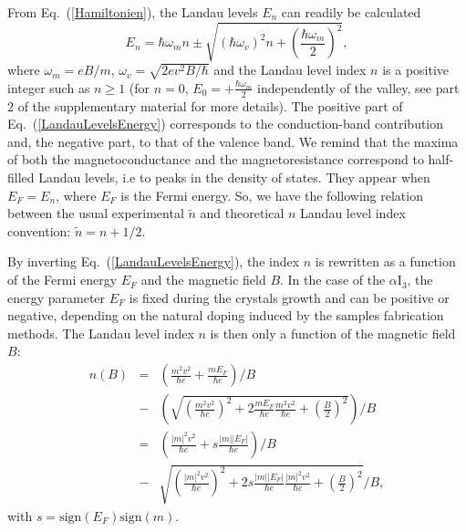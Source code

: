 \documentclass[doublecol]{epl2}
\begin{document}
From Eq.~(\ref{Hamiltonien}), the Landau levels $E_{n}$ can readily be calculated~\cite{MarkPhaseBerryContinuous,Sharapov,Rashba,Wang}
\begin{equation}
E_{n}=\hbar\omega_{m} n\pm \sqrt{\left(\hbar\omega_{v}\right)^2\! n +\left(\frac{\hbar \omega_{m}}{2}\right)^2},
\label{LandauLevelsEnergy}
\end{equation}
where $\omega_{m}=eB/m$, $\omega_{v}= \sqrt{2e v^2 B/\hbar}$ and the Landau level index $n$ is a positive integer such as $n\geq 1$ 
(for $n=0$, $E_{0}=+\frac{\hbar\omega_{m}}{2}$ independently of the valley, see part $2$ of the supplementary material for more details). The positive part of Eq.~(\ref{LandauLevelsEnergy}) corresponds to the conduction-band
contribution and, the negative part, to that of the valence band. We remind that the maxima of both the magnetoconductance and the magnetoresistance correspond to half-filled Landau levels, i.e to peaks in the density of states\cite{Coleridge,Ando}. They appear when $E_{F}=E_{n}$, where $E_{F}$ is the Fermi energy. 
So, we have the following relation between the usual experimental $\tilde{n}$ and theoretical $n$ Landau level index convention: $\tilde{n}=n+1/2$.  

By inverting Eq.~(\ref{LandauLevelsEnergy}), the index $n$ is rewritten as a function of the Fermi energy $E_{F}$ and the magnetic field $B$. In the case of the $\alpha$I$_{3}$, the energy parameter $E_{F}$ is fixed during the crystals growth and can be positive or negative, depending on the natural doping induced by the samples fabrication methods. The Landau level index $n$ is then only a function of the magnetic field $B$: 
\begin{equation}
\begin{array}{lll}
n(B)&=&\left(\frac{m^2v^2}{\hbar e}+\frac{mE_{F}}{\hbar e}\right)/B\\[0.15cm]
&-&\left(\sqrt{\left(\frac{m^2v^2}{\hbar e}\right)^2+2\frac{mE_{F}}{\hbar e}\frac{m^2v^2}{\hbar e}+\left(\frac{B}{2}\right)^2}\right)/B \\[0.15cm]
&=&\left(\frac{\left|m\right|^2v^2}{\hbar e}+s\frac{\left|m\right|\left|E_{F}\right|}{\hbar e}\right)/B\\[0.15cm]
&-&\sqrt{\left(\frac{\left|m\right|^2v^2}{\hbar e}\right)^2+2s\frac{\left|m\right|\left|E_{F}\right|}{\hbar e}\frac{\left|m\right|^2v^2}{\hbar e}+\left(\frac{B}{2}\right)^2}/B,
\end{array}
\label{IndexLandauLevels}
\end{equation}
with $s=\mathrm{sign}(E_{F})\mathrm{sign}(m)$.
\end{document}
